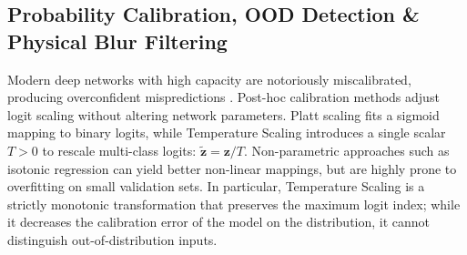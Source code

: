 \documentclass[conference]{IEEEtran}
\begin{document}
\begin{table}[t]
\centering
\caption{Comparative 6-Paradigm Taxonomy of Uncertainty Quantification and Perception Integrity Approaches}
\label{tab:taxonomy_uq}
\end{table}

\subsection{Probability Calibration, OOD Detection \& Physical Blur Filtering}
Modern deep networks with high capacity are notoriously miscalibrated, producing overconfident mispredictions \cite{guo2017calibration}. Post-hoc calibration methods adjust logit scaling without altering network parameters. Platt scaling \cite{platt1999probabilistic} fits a sigmoid mapping to binary logits, while Temperature Scaling \cite{guo2017calibration} introduces a single scalar $T > 0$ to rescale multi-class logits: $\tilde{\mathbf{z}} = \mathbf{z} / T$. Non-parametric approaches such as isotonic regression \cite{zadrozny2002transforming} can yield better non-linear mappings, but are highly prone to overfitting on small validation sets. In particular, Temperature Scaling \cite{guo2017calibration} is a strictly monotonic transformation that preserves the maximum logit index; while it decreases the calibration error of the model on the distribution, it cannot distinguish out-of-distribution inputs.
\end{document}

